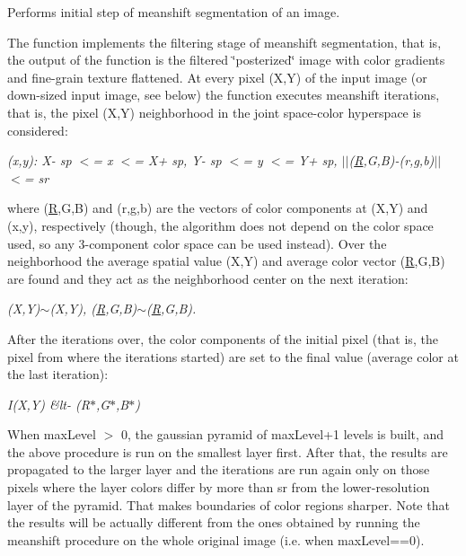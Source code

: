 Performs initial step of meanshift segmentation of an image.

The function implements the filtering stage of meanshift segmentation, that is, the output of the function is the filtered \char`\"{}posterized\char`\"{} image with color gradients and fine-\/grain texture flattened. At every pixel {\ttfamily (X,Y)} of the input image (or down-\/sized input image, see below) the function executes meanshift iterations, that is, the pixel {\ttfamily (X,Y)} neighborhood in the joint space-\/color hyperspace is considered\+:

{\itshape (x,y)\+: X-\/ sp $<$= x $<$= X+ sp, Y-\/ sp $<$= y $<$= Y+ sp, $\vert$$\vert$(\mbox{\hyperlink{classorg_1_1opencv_1_1_r}{R}},G,B)-\/(r,g,b)$\vert$$\vert$ $<$= sr}

where {\ttfamily (\mbox{\hyperlink{classorg_1_1opencv_1_1_r}{R}},G,B)} and {\ttfamily (r,g,b)} are the vectors of color components at {\ttfamily (X,Y)} and {\ttfamily (x,y)}, respectively (though, the algorithm does not depend on the color space used, so any 3-\/component color space can be used instead). Over the neighborhood the average spatial value {\ttfamily (X\textquotesingle{},Y\textquotesingle{})} and average color vector {\ttfamily (\mbox{\hyperlink{classorg_1_1opencv_1_1_r}{R}}\textquotesingle{},G\textquotesingle{},B\textquotesingle{})} are found and they act as the neighborhood center on the next iteration\+:

{\itshape (X,Y)$\sim$(X\textquotesingle{},Y\textquotesingle{}), (\mbox{\hyperlink{classorg_1_1opencv_1_1_r}{R}},G,B)$\sim$(\mbox{\hyperlink{classorg_1_1opencv_1_1_r}{R}}\textquotesingle{},G\textquotesingle{},B\textquotesingle{}).}

After the iterations over, the color components of the initial pixel (that is, the pixel from where the iterations started) are set to the final value (average color at the last iteration)\+:

{\itshape I(\+X,\+Y) \&lt-\/ (R$\ast$,G$\ast$,B$\ast$)}

When {\ttfamily max\+Level $>$ 0}, the gaussian pyramid of {\ttfamily max\+Level+1} levels is built, and the above procedure is run on the smallest layer first. After that, the results are propagated to the larger layer and the iterations are run again only on those pixels where the layer colors differ by more than {\ttfamily sr} from the lower-\/resolution layer of the pyramid. That makes boundaries of color regions sharper. Note that the results will be actually different from the ones obtained by running the meanshift procedure on the whole original image (i.\+e. when {\ttfamily max\+Level==0}).

